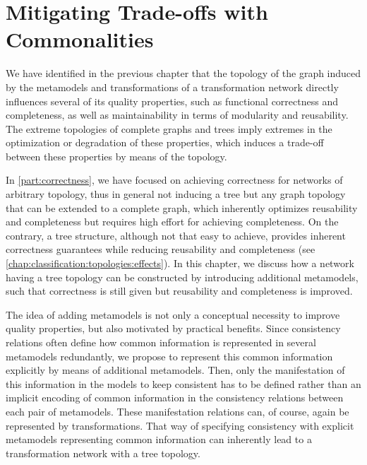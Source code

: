\chapter{Mitigating Trade-offs with Commonalities 
}
\label{chap:improvement}

We have identified in the previous chapter that the topology of the graph induced by the metamodels and transformations of a transformation network directly influences several of its quality properties, such as functional correctness and completeness, as well as maintainability in terms of modularity and reusability.
The extreme topologies of complete graphs and trees imply extremes in the optimization or degradation of these properties, which induces a trade-off between these properties by means of the topology.


In \autoref{part:correctness}, we have focused on achieving correctness for networks of arbitrary topology, thus in general not inducing a tree but any graph topology that can be extended to a complete graph, which inherently optimizes reusability and completeness but requires high effort for achieving completeness.
On the contrary, a tree structure, although not that easy to achieve, provides inherent correctness guarantees while reducing reusability and completeness (see \autoref{chap:classification:topologies:effects}).
In this chapter, we discuss how a network having a tree topology can be constructed by introducing additional metamodels, such that correctness is still given but reusability and completeness is improved.

The idea of adding metamodels is not only a conceptual necessity to improve quality properties, but also motivated by practical benefits.
Since consistency relations often define how common information is represented in several metamodels redundantly, we propose to represent this common information explicitly by means of additional metamodels.
Then, only the manifestation of this information in the models to keep consistent has to be defined rather than an implicit encoding of common information in the consistency relations between each pair of metamodels.
These manifestation relations can, of course, again be represented by transformations.
That way of specifying consistency with explicit metamodels representing common information can inherently lead to a transformation network with a tree topology.

